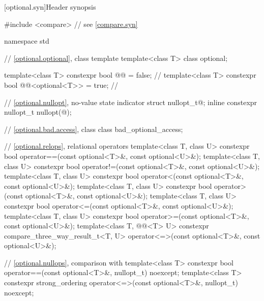[optional.syn]{Header  synopsis}

%
\begin{codeblock}
#include <compare>              // see \ref{compare.syn}

namespace std {
  // \ref{optional.optional}, class template 
  template<class T>
    class optional;

  template<class T>
    constexpr bool @@ = false;                 // \expos
  template<class T>
    constexpr bool @@<optional<T>> = true;     // \expos

  // \ref{optional.nullopt}, no-value state indicator
  struct nullopt_t{@\seebelow@};
  inline constexpr nullopt_t nullopt(@\unspec@);

  // \ref{optional.bad.access}, class 
  class bad_optional_access;

  // \ref{optional.relops}, relational operators
  template<class T, class U>
    constexpr bool operator==(const optional<T>&, const optional<U>&);
  template<class T, class U>
    constexpr bool operator!=(const optional<T>&, const optional<U>&);
  template<class T, class U>
    constexpr bool operator<(const optional<T>&, const optional<U>&);
  template<class T, class U>
    constexpr bool operator>(const optional<T>&, const optional<U>&);
  template<class T, class U>
    constexpr bool operator<=(const optional<T>&, const optional<U>&);
  template<class T, class U>
    constexpr bool operator>=(const optional<T>&, const optional<U>&);
  template<class T, @@<T> U>
    constexpr compare_three_way_result_t<T, U>
      operator<=>(const optional<T>&, const optional<U>&);

  // \ref{optional.nullops}, comparison with 
  template<class T> constexpr bool operator==(const optional<T>&, nullopt_t) noexcept;
  template<class T>
    constexpr strong_ordering operator<=>(const optional<T>&, nullopt_t) noexcept;

}
\end{codeblock}
